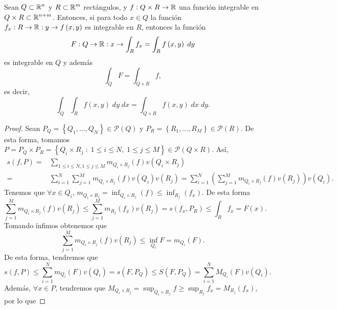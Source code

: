 \begin{theorem}
Sean $\displaystyle Q \subset \mathbb{R}^{n} $ y $\displaystyle R \subset \mathbb{R}^{m} $ rectángulos, y $\displaystyle f : Q \times R \to \mathbb{R} $ una función integrable en $\displaystyle Q \times R \subset \mathbb{R}^{n+m} $. Entonces, si para todo $\displaystyle x \in Q $ la función $\displaystyle f_{x} : R \to \mathbb{R} : y \to f\left(x,y\right) $ es integrable en $\displaystyle R $, entonces la función 
	\[ F : Q \to \mathbb{R} : x \to \int _{R}f_{x} =\int _{R}f\left(x,y\right) \; dy\]
	es integrable en $\displaystyle Q $ y además
	\[\int _{Q}F =\int _{Q \times R}f  ,\]
	es decir,
	\[\int _{Q}\int _{R}f\left(x,y\right) \; dy \; dx = \int _{Q \times R}f\left(x,y\right) \; dx \; dy .\]
\end{theorem}
\begin{proof}
	Sean $\displaystyle P_{Q}= \left\{ Q_{1}, \ldots, Q_{N}\right\} \in \mathcal{P}\left(Q\right) $ y $\displaystyle P_{R} = \left\{ R_{1}, \ldots, R_{M}\right\} \in \mathcal{P}\left(R\right) $. De esta forma, tomamos $\displaystyle P = P_{Q} \times P_{R} = \left\{ Q_{i} \times R_{j} \; : \; 1 \leq i \leq N, \; 1 \leq j \leq M\right\} \in \mathcal{P}\left(Q \times R\right) $. 
Así, 
\[
\begin{split}
	s\left(f,P\right)= & \sum^{}_{1 \leq i \leq N, 1 \leq j \leq M}m_{Q_{i} \times R_{j}}\left(f\right)v\left(Q_{i} \times R_{j}\right)\\
	= & \sum^{N}_{i = 1}\sum^{M}_{j=1}m_{Q_{i} \times R_{j}}\left(f\right)v\left(Q_{i}\right)v\left(R_{j}\right)=\sum^{N}_{i=1}\left(\sum^{M}_{j = 1}m_{Q_{i}\times R_{j}}\left(f\right)v\left(R_{j}\right)\right)v\left(Q_{i}\right).
\end{split}
\]
Tenemos que $\displaystyle \forall x \in Q_{i} $, $\displaystyle m_{Q_{i} \times R_{j}} = \inf_{Q_{i}\times R_{j}}\left(f\right) \leq \inf_{R_{j}}\left(f_{x}\right) $. De esta forma
\[\sum^{M}_{j = 1}m_{Q_{i} \times R_{j}}\left(f\right)v\left(R_{j}\right)\leq \sum^{M}_{j = 1}m_{R_{j}}\left(f_{x}\right)v\left(R_{j}\right)=s\left(f_{x}, P_{R}\right)\leq \int _{R}f_{x} = F\left(x\right) .\]
Tomando ínfimos obtenemos que 
\[\sum^{M}_{j = 1}m_{Q_{i} \times R_{j}}\left(f\right)v\left(R_{j}\right)\leq \inf_{Q_{i}}F=m_{Q_{i}}\left(F\right) .\]
De esta forma, tendremos que 
\[s\left(f,P\right)\leq \sum^{N}_{i = 1}m_{Q_{i}}\left(F\right)v\left(Q_{i}\right) = s\left(F, P_{Q}\right) \leq S\left(F, P_{Q}\right) = \sum^{N}_{i = 1}M_{Q_{i}}\left(F\right)v\left(Q_{i}\right) .\]
Además, $\displaystyle \forall x \in P $, tendremos que $\displaystyle M_{Q_{i} \times R_{j}}= \sup_{Q_{i} \times R_{j}}f \geq \sup_{R_{j}}f_{x}=M_{R_{j}}\left(f_{x}\right) $, por lo que

\end{proof}
